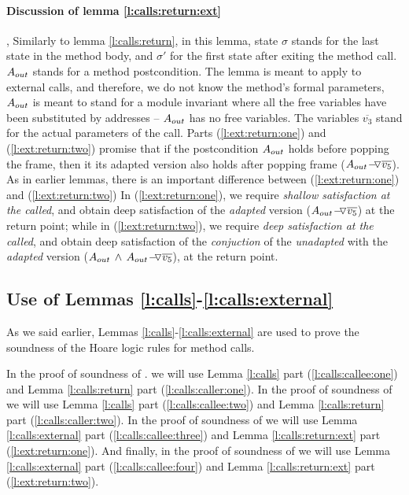 \paragraph{Discussion of lemma  \ref{l:calls:return:ext}}, Similarly to  lemma \ref{l:calls:return},  
in this lemma, state  $\sigma$ stands for the last state in the method body, and $\sigma'$ for the first state after exiting  the method call.
$A_{out}$ stands for a method postcondition.
The lemma is meant to apply to external calls, and therefore, we do not know the method's formal parameters, 
$A_{out}$ is meant to stand for a module invariant where all the free variables have been substituted by addresses --
\ie $A_{out}$ has no free variables.
The variables $\overline {v_3}$ stand for the actual parameters of the call.
Parts    (\ref{l:ext:return:one})  and  (\ref{l:ext:return:two})
promise that if the postcondition $A_{out}$ holds before popping the frame, then it its adapted version 
also holds after popping frame (${ A_{out} \!-\!\!\!\,\!{\triangledown} \overline {v_5}}$).
 As in earlier lemmas, there is an important difference between   (\ref{l:ext:return:one})  and  (\ref{l:ext:return:two})
In  (\ref{l:ext:return:one}),  we require \emph{shallow satisfaction at the called}, 
and obtain   deep satisfaction of the \emph{adapted} version (${ A_{out} \!-\!\!\!\,\!{\triangledown} \overline {v_5}}$) at the return point;
while in (\ref{l:ext:return:two}), we  require \emph{deep satisfaction at the called}, 
and obtain deep satisfaction of the   \emph{conjuction}  of the \emph{unadapted} with the \emph{adapted} version (${A_{out} \, \wedge\, { A_{out} \!-\!\!\!\,\!{\triangledown} \overline {v_5}}}$),
at the return point.

\subsection{\textbf{Use of Lemmas \ref{l:calls}-\ref{l:calls:external} }}

As we said earlier, Lemmas \ref{l:calls}-\ref{l:calls:external} are used to prove the soundness of the Hoare logic rules for method calls.

In the proof of soundness of {}. we will use Lemma \ref{l:calls} part (\ref{l:calls:callee:one}) and Lemma \ref{l:calls:return} part (\ref{l:calls:caller:one}).  
In the proof of soundness of {} we will use  Lemma \ref{l:calls} part (\ref{l:calls:callee:two}) and Lemma \ref{l:calls:return} part (\ref{l:calls:caller:two}).
In the proof of soundness of {} we will use  Lemma \ref{l:calls:external} part (\ref{l:calls:callee:three}) and Lemma \ref{l:calls:return:ext} part (\ref{l:ext:return:one}).
And finally, in the proof of soundness of {} we will use  Lemma \ref{l:calls:external} part (\ref{l:calls:callee:four}) and Lemma \ref{l:calls:return:ext} part (\ref{l:ext:return:two}).



 



 
 
  
